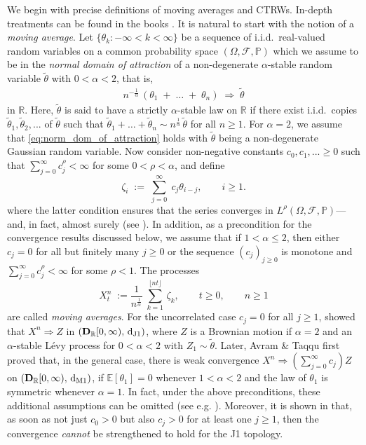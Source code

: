 \documentclass[11pt]{article}
\theoremstyle{definition}\newtheorem{example}[theorem]{Example}
\theoremstyle{definition}\newtheorem{counterexample}[theorem]{Counterexample}
\theoremstyle{definition}\newtheorem{remark}[theorem]{Remark}
\theoremstyle{definition}\newtheorem{defi}[theorem]{Definition}
\numberwithin{equation}{section}
\newcommand{\R}{\mathbb{R}}
\newcommand{\D}{{\bf D}}											%
\newcommand*\diff{\mathop{}\!\mathrm{d}}								%
\newcommand{\E}{\mathbb{E}}											%
\newcommand{\Pro}{\mathbb{P}}										%
\renewcommand{\|}{\; : \, \;}											%
\newcommand{\dJ}{\diff_{\operatorname{J1}}}								%
\newcommand{\dM}{\diff_{\operatorname{M1}}}							%
\begin{document}
We begin with precise definitions of moving averages and CTRWs. In-depth treatments can be found in the books \cite{book_meerschaert_scheffler, book_Meerschaert}. It is natural to start with the notion of a \emph{moving average}. Let $\{ \theta_k : -\infty < k < \infty \}$ be a sequence of i.i.d.~real-valued random variables on a common probability space $(\Omega, \mathcal{F}, \Pro)$ which we assume to be in the \emph{normal domain of attraction} of a non-degenerate $\alpha$-stable random variable $\tilde{\theta}$ with $0< \alpha< 2$, that is,
\begin{align} n^{-\frac{1}{\alpha}} \,\left(\theta_1 \; + \; \hdots\; + \; \theta_n \right) \; \Rightarrow \; \tilde \theta \label{eq:norm_dom_of_attraction}
\end{align}
in $\mathbb{R}$. Here, $\tilde{\theta}$ is said to have a strictly $\alpha$-stable law on $\mathbb{R}$ if there exist i.i.d.~copies $\tilde{\theta}_1,\tilde{\theta}_2,... $ of $\tilde{\theta}$ such that 
$\tilde{\theta}_1  +  \hdots +  \tilde{\theta}_n \sim  n^{\frac1\alpha} \, \tilde{\theta}$ for all $ n\geq 1.$
For $\alpha=2$, we assume that \eqref{eq:norm_dom_of_attraction} holds with $\tilde\theta$ being a non-degenerate Gaussian random variable. Now consider non-negative constants $c_0,c_1,...\ge 0$ such that $\sum_{j=0}^\infty c_j^\rho < \infty$ for some $0<\rho<\alpha$, and define
\begin{equation}\label{eq:linear_process_innovations} \zeta_i \; := \; \sum_{j=0}^\infty \; c_j \theta_{i-j}, \qquad i \ge 1.
\end{equation}
where the latter condition ensures that the series converges in $L^\rho(\Omega, \mathcal{F}, \Pro)$---and, in fact, almost surely (see \cite{avram, kawata}). In addition, as a precondition for the convergence results discussed below, we assume that if $1<\alpha\le 2$, then either $c_j=0$ for all but finitely many $j\ge 0$ or the sequence $(c_j)_{j\ge 0}$ is monotone and $\sum_{j=0}^\infty c_j^\rho <\infty$ for some $\rho<1$.
The processes
\begin{equation} X^n_t \; :=  \frac{1}{n^{\frac 1 \alpha}}\; \sum_{k=1}^{\lfloor nt \rfloor} \, \zeta_k,\qquad t\geq0,\qquad n\geq1 \label{eq:MovAv}
\end{equation}
are called \emph{moving averages}. For the uncorrelated case $c_j=0$ for all $j\ge 1$, \cite{skorokhod} showed that $X^n \Rightarrow Z$ in $(\D_{\R}[0,\infty), \, \dJ)$, where $Z$ is a Brownian motion if $\alpha=2$ and an $\alpha$-stable Lévy process for $0<\alpha<2$ with $Z_1 \sim \tilde \theta$. Later, Avram \& Taqqu \cite{avram} first proved that, in the general case, there is weak convergence $ X^n \Rightarrow (\sum_{j=0}^\infty c_j) Z$ on $(\D_{\R}[0,\infty), \, \dM)$, if $\E[\theta_1]=0$ whenever $1<\alpha <2$ and the law of $\theta_1$ is symmetric whenever $\alpha=1$. In fact, under the above preconditions, these additional assumptions can be omitted (see e.g. \cite[Thm.~4.7.1]{whitt}). Moreover, it is shown in \cite{avram} that, as soon as not just $c_0>0$ but also $c_j>0$ for at least one $j\ge 1$, then the convergence \emph{cannot} be strengthened to hold for the J1 topology.
\end{document}
